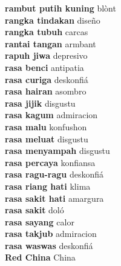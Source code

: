 \textbf{ rambut putih kuning  } blònt \\
\textbf{ rangka tindakan  } diseño \\
\textbf{ rangka tubuh  } carcas \\
\textbf{ rantai tangan  } armbant \\
\textbf{ rapuh jiwa  } depresivo \\
\textbf{ rasa benci  } antipatia \\
\textbf{ rasa curiga  } deskonfiá \\
\textbf{ rasa hairan  } asombro \\
\textbf{ rasa jijik  } disgustu \\
\textbf{ rasa kagum  } admiracion \\
\textbf{ rasa malu  } konfushon \\
\textbf{ rasa meluat  } disgustu \\
\textbf{ rasa menyampah  } disgustu \\
\textbf{ rasa percaya  } konfiansa \\
\textbf{ rasa ragu-ragu  } deskonfiá \\
\textbf{ rasa riang hati  } klima \\
\textbf{ rasa sakit hati  } amargura \\
\textbf{ rasa sakit  } doló \\
\textbf{ rasa sayang  } calor \\
\textbf{ rasa takjub  } admiracion \\
\textbf{ rasa waswas  } deskonfiá \\
\textbf{ Red China  } China \\
